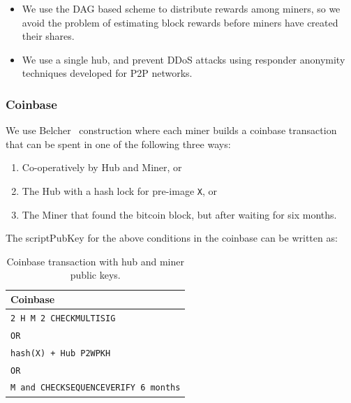 \documentclass{article}
\begin{document}
\begin{itemize}
\item We use the DAG based scheme to distribute rewards among miners,
  so we avoid the problem of estimating block rewards before miners
  have created their shares.
\item We use a single hub, and prevent DDoS attacks using responder
  anonymity~\cite{responder-anonymity:file-sharing, liu2010rumor,
  responder-anonymity:p2p, gap-gnunet} techniques
  developed for P2P networks.
\end{itemize}



\subsubsection{Coinbase}

We use Belcher~\cite{channels-for-rewards} construction where each
miner builds a coinbase transaction that can be spent in one of the
following three ways:

\begin{enumerate}
\item Co-operatively by Hub and Miner, or
\item The Hub with a hash lock for pre-image \verb|X|, or
\item The Miner that found the bitcoin block, but after waiting
  for six months.
\end{enumerate}

The scriptPubKey for the above conditions in the coinbase can be
written as:

\begin{table}
  \centering
  \begin{tabular}{ l }
    \bfseries Coinbase \\
    \midrule
    \verb|2 H M 2 CHECKMULTISIG| \\
    \verb|OR| \\
    \verb|hash(X) + Hub P2WPKH| \\
    \verb|OR| \\
    \verb|M and CHECKSEQUENCEVERIFY 6 months| \\ 
    \midrule
  \end{tabular}
  \caption{Coinbase transaction with hub and miner public keys.}\label{table:coinbase}
\end{table}
\end{document}
